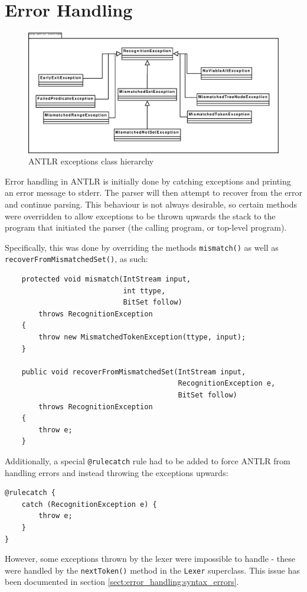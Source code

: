 \section{Error Handling}
\label{sec:impl:errorhandling}
\begin{figure}[!h]
  \centering
    \includegraphics[width=1\textwidth]{diagrams/exception_uml}
  \caption{ANTLR exceptions class hierarchy}
\end{figure}
Error handling in ANTLR is initially done by catching exceptions and printing
an error message to stderr. The parser will then attempt to recover from the
error and continue parsing. This behaviour is not always desirable, so certain
methods were overridden to allow exceptions to be thrown upwards the stack to
the program that initiated the parser (the calling program, or top-level
program).

Specifically, this was done by overriding the methods \verb!mismatch()! as well as
\verb!recoverFromMismatchedSet()!, as such:

\begin{Verbatim}
    protected void mismatch(IntStream input, 
                            int ttype, 
                            BitSet follow)
        throws RecognitionException
    {
        throw new MismatchedTokenException(ttype, input);
    }

    public void recoverFromMismatchedSet(IntStream input, 
                                         RecognitionException e, 
                                         BitSet follow)
        throws RecognitionException
    {
        throw e;
    }
\end{Verbatim}

Additionally, a special \verb!@rulecatch! rule had to be added to force ANTLR from
handling errors and instead throwing the exceptions upwards:

\begin{Verbatim}
@rulecatch {
    catch (RecognitionException e) {
        throw e;
    }
}
\end{Verbatim}

However, some exceptions thrown by the lexer were impossible to handle - these
were handled by the \verb!nextToken()! method in the \verb!Lexer! superclass.
This issue has been documented in section 
\ref{sect:error_handling:syntax_errors}.
